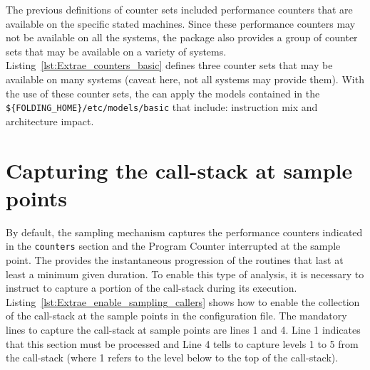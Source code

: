 The previous definitions of counter sets included performance counters that are available on the specific stated machines.
Since these performance counters may not be available on all the systems, the package also provides a group of counter sets that may be available on a variety of systems.
Listing~\ref{lst:Extrae_counters_basic} defines three \EXTRAE counter sets that may be available on many systems (caveat here, not all systems may provide them).
With the use of these counter sets, the \FOLDING can apply the models contained in the \texttt{\$\{FOLDING\_HOME\}/etc/models/basic} that include: instruction mix and architecture impact.


\section{Capturing the call-stack at sample points}



By default, the sampling mechanism captures the performance counters indicated in the \texttt{counters} section and the Program Counter interrupted at the sample point.
The \FOLDING provides the instantaneous progression of the routines that last at least a minimum given duration.
To enable this type of analysis, it is necessary to instruct \EXTRAE to capture a portion of the call-stack during its execution.
Listing~\ref{lst:Extrae_enable_sampling_callers} shows how to enable the collection of the call-stack at the sample points in the \EXTRAE configuration file.
The mandatory lines to capture the call-stack at sample points are lines 1 and 4.
Line 1 indicates that this section must be processed and Line 4 tells \EXTRAE to capture levels 1 to 5 from the call-stack (where 1 refers to the level below to the top of the call-stack).


